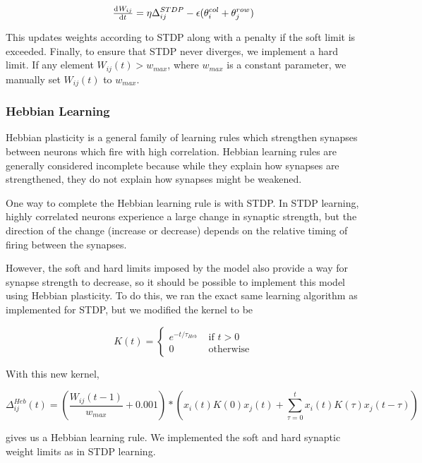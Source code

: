 \documentclass[12pt, final]{article}
\begin{document}
\begin{equation}
\od{W_{ij}}{t} = \eta\Delta^{STDP}_{ij} - \epsilon(\theta^{col}_i + \theta^{row}_j)
\label{Learning}
\end{equation}

This updates weights according to STDP along with a penalty if the soft limit is exceeded. Finally, to ensure that STDP never diverges, we implement a hard limit. If any element \(W_{ij}(t) > w_{max}\), where \(w_{max}\) is a constant parameter, we manually set \(W_{ij}(t)\) to \(w_{max}\). 

\subsubsection{Hebbian Learning}

Hebbian plasticity is a general family of learning rules which strengthen synapses between neurons which fire with high correlation. Hebbian learning rules are generally considered incomplete because while they explain how synapses are strengthened, they do not explain how synapses might be weakened. 

One way to complete the Hebbian learning rule is with STDP. In STDP learning, highly correlated neurons experience a large change in synaptic strength, but the direction of the change (increase or decrease) depends on the relative timing of firing between the synapses.

However, the soft and hard limits imposed by the model also provide a way for synapse strength to decrease, so it should be possible to implement this model using Hebbian plasticity. To do this, we ran the exact same learning algorithm as implemented for STDP, but we modified the kernel to be

\[K(t) = 
\begin{cases}
e^{-t/\tau_{Heb}} &\text{ if } t > 0\\
0 &\text{ otherwise}
\end{cases}
\]

With this new kernel, 

\begin{equation}
\Delta^{Heb}_{ij}(t) = \left(\frac{W_{ij}(t-1)}{w_{max}} + 0.001\right)*\left(x_i(t)K(0)x_j(t) + \sum_{\tau = 0}^t  x_i(t)K(\tau)x_j(t -\tau)\right)
\label{Heb}
\end{equation}

gives us a Hebbian learning rule. We implemented the soft and hard synaptic weight limits as in STDP learning.
\end{document}
